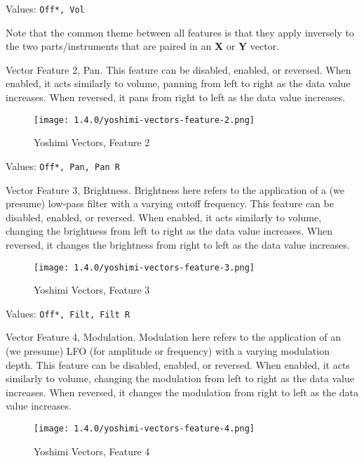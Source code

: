    Values: \texttt{Off*, Vol}

   Note that the common theme between all features is that they apply inversely
   to the two parts/instruments that are paired in an \textbf{X}
   or \textbf{Y} vector.

   Vector Feature 2, Pan.
   This feature can be disabled, enabled, or reversed.
   When enabled, it acts similarly to volume, panning from left to right as the
   data value increases.
   When reversed, it pans from right to left as the data value increases.

\begin{figure}[H]
   \centering
   \texttt{[image: 1.4.0/yoshimi-vectors-feature-2.png]}
   \caption{Yoshimi Vectors, Feature 2}
   \label{fig:yoshimi_vectors_feature_2}
\end{figure}

   Values: \texttt{Off*, Pan, Pan R}

   Vector Feature 3, Brightness.
   Brightness here refers to the application of a (we presume) low-pass filter
   with a varying cutoff frequency.
   This feature can be disabled, enabled, or reversed.
   When enabled, it acts similarly to volume, changing the brightness
   from left to right as the data value increases.
   When reversed, it changes the brightness from right to left as the data
   value increases.

\begin{figure}[H]
   \centering
   \texttt{[image: 1.4.0/yoshimi-vectors-feature-3.png]}
   \caption{Yoshimi Vectors, Feature 3}
   \label{fig:yoshimi_vectors_feature_3}
\end{figure}

   Values: \texttt{Off*, Filt, Filt R}

   Vector Feature 4, Modulation.
   Modulation here refers to the application of an (we presume) LFO
   (for amplitude or frequency) with a varying modulation depth.
   This feature can be disabled, enabled, or reversed.
   When enabled, it acts similarly to volume, changing the modulation
   from left to right as the data value increases.
   When reversed, it changes the modulation from right to left as the data
   value increases.

\begin{figure}[H]
   \centering
   \texttt{[image: 1.4.0/yoshimi-vectors-feature-4.png]}
   \caption{Yoshimi Vectors, Feature 4}
   \label{fig:yoshimi_vectors_feature_4}
\end{figure}

